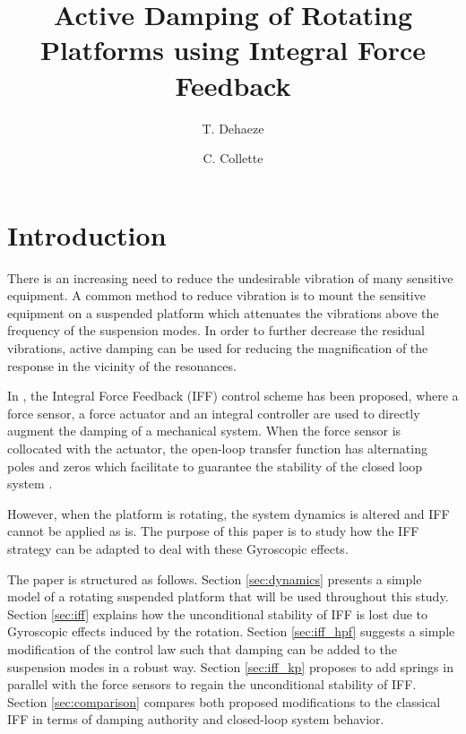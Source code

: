 \documentclass{ISMA_USD2020}
\author[1,3] {T. Dehaeze}
\author[1,2] {C. Collette}
\affil[1] {Precision Mechatronics Laboratory\NewLineAffil University of Liege, Belgium \NewAffil}
\affil[2] {BEAMS Department\NewLineAffil Free University of Brussels, Belgium \NewAffil}
\affil[3] {European Synchrotron Radiation Facility \NewLineAffil Grenoble, France e-mail: \textbf{thomas.dehaeze@esrf.fr}}
\date{}
\title{Active Damping of Rotating Platforms using Integral Force Feedback}
\begin{document}
\maketitle


\section{Introduction}
\label{sec:org72e892d}
\label{sec:introduction}
There is an increasing need to reduce the undesirable vibration of many sensitive equipment.
A common method to reduce vibration is to mount the sensitive equipment on a suspended platform which attenuates the vibrations above the frequency of the suspension modes.
In order to further decrease the residual vibrations, active damping can be used for reducing the magnification of the response in the vicinity of the resonances.

In \cite{preumont92_activ_dampin_by_local_force}, the Integral Force Feedback (IFF) control scheme has been proposed, where a force sensor, a force actuator and an integral controller are used to directly augment the damping of a mechanical system.
When the force sensor is collocated with the actuator, the open-loop transfer function has alternating poles and zeros which facilitate to guarantee the stability of the closed loop system \cite{preumont02_force_feedb_versus_accel_feedb}.

However, when the platform is rotating, the system dynamics is altered and IFF cannot be applied as is.
The purpose of this paper is to study how the IFF strategy can be adapted to deal with these Gyroscopic effects.

The paper is structured as follows.
Section \ref{sec:dynamics} presents a simple model of a rotating suspended platform that will be used throughout this study.
Section \ref{sec:iff} explains how the unconditional stability of IFF is lost due to Gyroscopic effects induced by the rotation.
Section \ref{sec:iff_hpf} suggests a simple modification of the control law such that damping can be added to the suspension modes in a robust way.
Section \ref{sec:iff_kp} proposes to add springs in parallel with the force sensors to regain the unconditional stability of IFF.
Section \ref{sec:comparison} compares both proposed modifications to the classical IFF in terms of damping authority and closed-loop system behavior.
\end{document}
